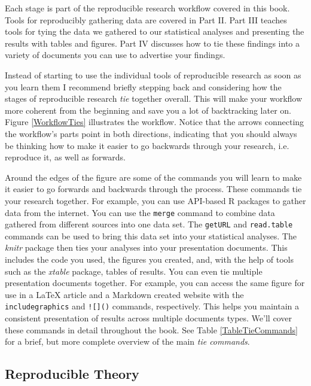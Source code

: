\noindent Each stage is part of the reproducible research workflow covered in this book. Tools for reproducibly gathering data are covered in Part II. Part III teaches tools for tying the data we gathered to our statistical analyses and presenting the results with tables and figures. Part IV discusses how to tie these findings into a variety of documents you can use to advertise your findings.

Instead of starting to use the individual tools of reproducible research  as soon as you learn them I recommend briefly stepping back and considering how the stages of reproducible research {\emph{tie}} together overall. This will make your workflow more coherent from the beginning and save you a lot of backtracking later on.  Figure \ref{WorkflowTies} illustrates the workflow. Notice that the arrows connecting the workflow's parts point in both directions, indicating that you should always be thinking how to make it easier to go backwards through your research, i.e. reproduce it, as well as forwards. 

Around the edges of the figure are some of the commands you will learn to make it easier to go forwards and backwards through the process. These commands tie your research together. For example, you can use API-based R packages to gather data from the internet. You can use the \texttt{merge} command to combine data gathered from different sources into one data set. The \texttt{getURL} and {\texttt{read.table}} commands can be used to bring this data set into your statistical analyses. The {\emph{knitr}} package then ties your analyses into your presentation documents. This includes the code you used, the figures you created, and, with the help of tools such as the {\emph{xtable}} package, tables of results. You can even tie multiple presentation documents together. For example, you can access the same figure for use in a LaTeX article and a Markdown created website with the \texttt{includegraphics} and \texttt{![]()}\index{![]()} commands, respectively. This helps you maintain a consistent presentation of results across multiple documents types. We'll cover these commands in detail throughout the book. See Table \ref{TableTieCommands} for a brief, but more complete overview of the main {\emph{tie commands}}. 

\subsection{Reproducible Theory}


